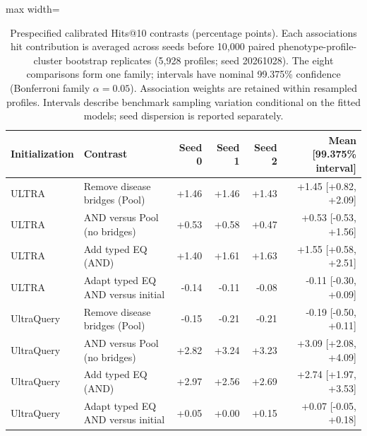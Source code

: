 \begin{table}[tb]
\centering\small
\caption{Prespecified calibrated Hits@10 contrasts (percentage points). Each association\textquotesingle s hit contribution is averaged across seeds before 10,000 paired phenotype-profile-cluster bootstrap replicates (5,928 profiles; seed 20261028). The eight comparisons form one family; intervals have nominal 99.375\% confidence (Bonferroni family $\alpha=0.05$). Association weights are retained within resampled profiles. Intervals describe benchmark sampling variation conditional on the fitted models; seed dispersion is reported separately.}
\label{tab:controlled_query_contrasts}
\begin{adjustbox}{max width=\linewidth}
\begin{tabular}{llrrrr}
\toprule
Initialization & Contrast & Seed 0 & Seed 1 & Seed 2 & Mean [99.375\% interval] \\
\midrule
ULTRA & Remove disease bridges (Pool) & +1.46 & +1.46 & +1.43 & +1.45 [+0.82, +2.09] \\
ULTRA & AND versus Pool (no bridges) & +0.53 & +0.58 & +0.47 & +0.53 [-0.53, +1.56] \\
ULTRA & Add typed EQ (AND) & +1.40 & +1.61 & +1.63 & +1.55 [+0.58, +2.51] \\
ULTRA & Adapt typed EQ AND versus initial & -0.14 & -0.11 & -0.08 & -0.11 [-0.30, +0.09] \\
UltraQuery & Remove disease bridges (Pool) & -0.15 & -0.21 & -0.21 & -0.19 [-0.50, +0.11] \\
UltraQuery & AND versus Pool (no bridges) & +2.82 & +3.24 & +3.23 & +3.09 [+2.08, +4.09] \\
UltraQuery & Add typed EQ (AND) & +2.97 & +2.56 & +2.69 & +2.74 [+1.97, +3.53] \\
UltraQuery & Adapt typed EQ AND versus initial & +0.05 & +0.00 & +0.15 & +0.07 [-0.05, +0.18] \\
\bottomrule
\end{tabular}
\end{adjustbox}
\end{table}
